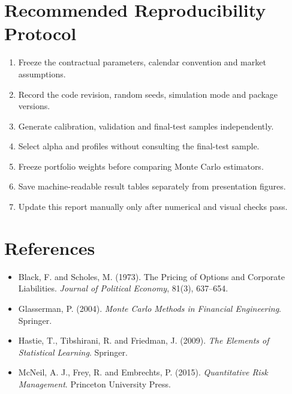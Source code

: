 \documentclass[11pt,a4paper]{article}
\begin{document}
\section{Recommended Reproducibility Protocol}

\begin{enumerate}
\item Freeze the contractual parameters, calendar convention and market assumptions.
\item Record the code revision, random seeds, simulation mode and package versions.
\item Generate calibration, validation and final-test samples independently.
\item Select alpha and profiles without consulting the final-test sample.
\item Freeze portfolio weights before comparing Monte Carlo estimators.
\item Save machine-readable result tables separately from presentation figures.
\item Update this report manually only after numerical and visual checks pass.
\end{enumerate}

\section{References}

\begin{itemize}
\item Black, F. and Scholes, M. (1973). The Pricing of Options and Corporate Liabilities. \emph{Journal of Political Economy}, 81(3), 637--654.
\item Glasserman, P. (2004). \emph{Monte Carlo Methods in Financial Engineering}. Springer.
\item Hastie, T., Tibshirani, R. and Friedman, J. (2009). \emph{The Elements of Statistical Learning}. Springer.
\item McNeil, A. J., Frey, R. and Embrechts, P. (2015). \emph{Quantitative Risk Management}. Princeton University Press.
\end{itemize}
\end{document}

